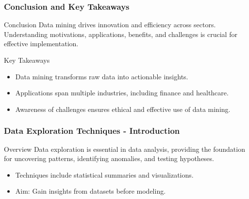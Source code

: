 \documentclass[aspectratio=169]{beamer}
\begin{document}
\begin{frame}[fragile]
    \frametitle{Conclusion and Key Takeaways}
    \begin{block}{Conclusion}
        Data mining drives innovation and efficiency across sectors. Understanding motivations, applications, benefits, and challenges is crucial for effective implementation.
    \end{block}

    \begin{block}{Key Takeaways}
        \begin{itemize}
            \item Data mining transforms raw data into actionable insights.
            \item Applications span multiple industries, including finance and healthcare.
            \item Awareness of challenges ensures ethical and effective use of data mining.
        \end{itemize}
    \end{block}
\end{frame}

\begin{frame}[fragile]
    \frametitle{Data Exploration Techniques - Introduction}
    \begin{block}{Overview}
        Data exploration is essential in data analysis, providing the foundation for uncovering patterns, identifying anomalies, and testing hypotheses.
    \end{block}
    \begin{itemize}
        \item Techniques include statistical summaries and visualizations.
        \item Aim: Gain insights from datasets before modeling.
    \end{itemize}
\end{frame}
\end{document}
